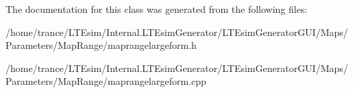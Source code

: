 The documentation for this class was generated from the following files\+:\begin{DoxyCompactItemize}
\item 
/home/trance/\+L\+T\+Esim/\+Internal.\+L\+T\+Esim\+Generator/\+L\+T\+Esim\+Generator\+G\+U\+I/\+Maps/\+Parameters/\+Map\+Range/maprangelargeform.\+h\item 
/home/trance/\+L\+T\+Esim/\+Internal.\+L\+T\+Esim\+Generator/\+L\+T\+Esim\+Generator\+G\+U\+I/\+Maps/\+Parameters/\+Map\+Range/maprangelargeform.\+cpp\end{DoxyCompactItemize}

